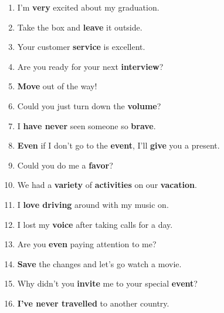 \begin{enumerate}
  \item I'm \textbf{very} excited about my graduation.
  \item Take the box and \textbf{leave} it outside.
  \item Your customer \textbf{service} is excellent.
  \item Are you ready for your next \textbf{interview}?
  \item \textbf{Move} out of the way!
  \item Could you just turn down the \textbf{volume}?
  \item I \textbf{have never} seen someone so \textbf{brave}.
  \item \textbf{Even} if I don't go to the \textbf{event}, I'll \textbf{give} you a present.
  \item Could you do me a \textbf{favor}?
  \item We had a \textbf{variety} of \textbf{activities} on our \textbf{vacation}.
  \item I \textbf{love driving} around with my music on.
  \item I lost my \textbf{voice} after taking calls for a day.
  \item Are you \textbf{even} paying attention to me?
  \item \textbf{Save} the changes and let's go watch a movie.
  \item Why didn't you \textbf{invite} me to your special \textbf{event}?
  \item \textbf{I've never travelled} to another country.
\end{enumerate}

\newpage






